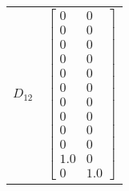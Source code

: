 \begin{tabular}{cl}
 $D_{12}$ & $\left[\begin{matrix}0 & 0\\0 & 0\\0 & 0\\0 & 0\\0 & 0\\0 & 0\\0 & 0\\0 & 0\\0 & 0\\0 & 0\\1.0 & 0\\0 & 1.0\end{matrix}\right]$                                                                                                                                                                                                                                                                                                                                                                                                                                                                                                                                                                                                                                                                                                                                                                                                                                                                                                                                                                                                                                                                                                                                                                                                                                                                                                                                                                                                                                                                                                                                                                                                                                                                                                                 \\

\end{tabular}
